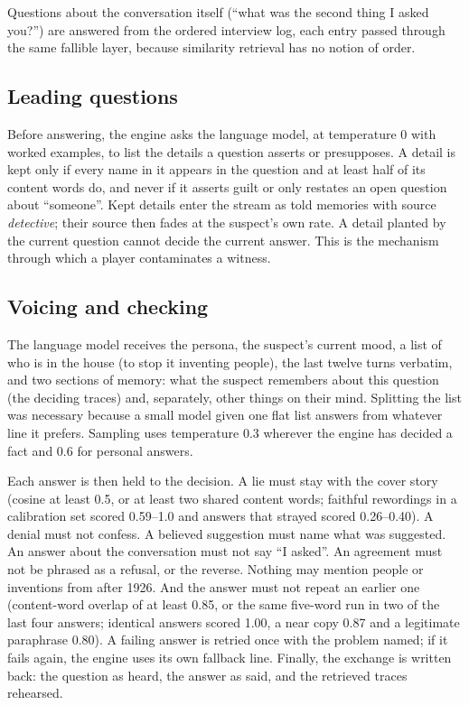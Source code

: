 \documentclass[conference]{IEEEtran}
\begin{document}
Questions about the conversation itself (``what was the second thing I asked you?'') are answered from
the ordered interview log, each entry passed through the same fallible layer, because similarity
retrieval has no notion of order.

\subsection{Leading questions}
Before answering, the engine asks the language model, at temperature 0 with worked examples, to list
the details a question asserts or presupposes. A detail is kept only if every name in it appears in
the question and at least half of its content words do, and never if it asserts guilt or only restates
an open question about ``someone''. Kept details enter the stream as told memories with source
\emph{detective}; their source then fades at the suspect's own rate. A detail planted by the current
question cannot decide the current answer. This is the mechanism through which a player contaminates
a witness.

\subsection{Voicing and checking}
The language model receives the persona, the suspect's current mood, a list of who is in the house
(to stop it inventing people), the last twelve turns verbatim, and two sections of memory: what the
suspect remembers about this question (the deciding traces) and, separately, other things on their
mind. Splitting the list was necessary because a small model given one flat list answers from whatever
line it prefers. Sampling uses temperature 0.3 wherever the engine has decided a fact and 0.6 for
personal answers.

Each answer is then held to the decision. A lie must stay with the cover story (cosine at least 0.5,
or at least two shared content words; faithful rewordings in a calibration set scored 0.59--1.0 and
answers that strayed scored 0.26--0.40). A denial must not confess. A believed suggestion must name what
was suggested. An answer about the conversation must not say ``I asked''. An agreement must not be
phrased as a refusal, or the reverse. Nothing may mention people or inventions from after 1926. And
the answer must not repeat an earlier one (content-word overlap of at least 0.85, or the same five-word
run in two of the last four answers; identical answers scored 1.00, a near copy 0.87 and a legitimate
paraphrase 0.80). A failing answer is retried once with the problem named; if it fails again, the engine
uses its own fallback line. Finally, the exchange is written back: the question as heard, the answer as
said, and the retrieved traces rehearsed.
\end{document}
